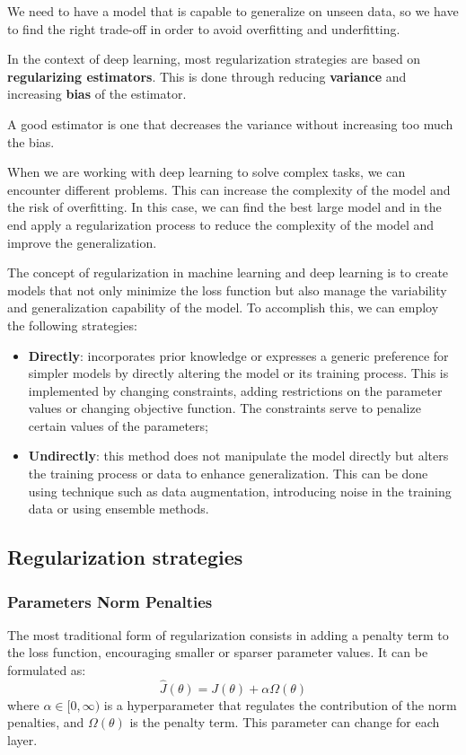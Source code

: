 We need to have a model that is capable to generalize on unseen data, so we have
to find the right trade-off in order to avoid overfitting and underfitting.

In the context of deep learning, most regularization strategies are based on
\textbf{regularizing estimators}. This is done through reducing \textbf{variance}
and increasing \textbf{bias} of the estimator.
\begin{note}
    A good estimator is one that decreases the variance without increasing too
    much the bias.
\end{note}

When we are working with deep learning to solve complex tasks, we can encounter
different problems. This can increase the complexity of the model and the risk of
overfitting. In this case, we can find the best large model and in the end apply
a regularization process to reduce the complexity of the model and improve the
generalization.

The concept of regularization in machine learning and deep learning is to create
models that not only minimize the loss function but also manage the variability
and generalization capability of the model. To accomplish this, we can employ the
following strategies:
\begin{itemize}
    \item \textbf{Directly}: incorporates prior knowledge or expresses a generic
          preference for simpler models by directly altering the model or its
          training process. This is implemented by changing constraints, adding
          restrictions on the parameter values or changing objective function.
          The constraints serve to penalize certain values of the parameters;
    \item \textbf{Undirectly}: this method does not manipulate the model directly
          but alters the training process or data to enhance generalization. This
          can be done using technique such as data augmentation, introducing noise
          in the training data or using ensemble methods.
\end{itemize}
\subsection{Regularization strategies}
\subsubsection{Parameters Norm Penalties}
The most traditional form of regularization consists in adding a penalty term to
the loss function, encouraging smaller or sparser parameter values. It can be
formulated as:
\begin{equation}
    \hat{J}(\theta) = J(\theta) + \alpha \Omega(\theta)
\end{equation}
where $\alpha \in [0, \infty)$ is a hyperparameter that regulates the contribution
of the norm penalties, and $\Omega(\theta)$ is the penalty term. This parameter
can change for each layer.

